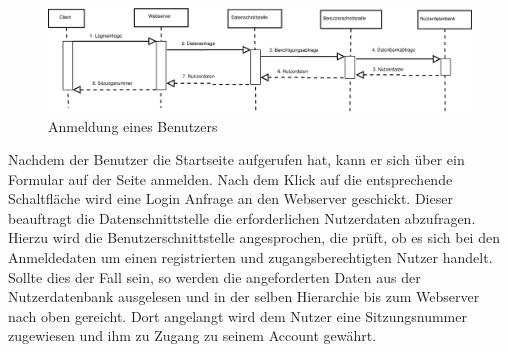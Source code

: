 \begin{figure}[h]
	\centering
	\includegraphics[width=1.0\linewidth]{Grafik/Diagramm/Szenarios/Login.eps}
	\caption[]{Anmeldung eines Benutzers}
\end{figure}

\noindent Nachdem der Benutzer die Startseite aufgerufen hat, kann er sich über ein Formular auf der Seite anmelden. Nach dem Klick auf die entsprechende Schaltfläche wird eine Login Anfrage an den Webserver geschickt. Dieser beauftragt die Datenschnittstelle die erforderlichen Nutzerdaten abzufragen. Hierzu wird die Benutzerschnittstelle angesprochen, die prüft, ob es sich bei den Anmeldedaten um einen registrierten und zugangsberechtigten Nutzer handelt. Sollte dies der Fall sein, so werden die angeforderten Daten aus der Nutzerdatenbank ausgelesen und in der selben Hierarchie bis zum Webserver nach oben gereicht. Dort angelangt wird dem Nutzer eine Sitzungsnummer zugewiesen und ihm zu Zugang zu seinem Account gewährt. 